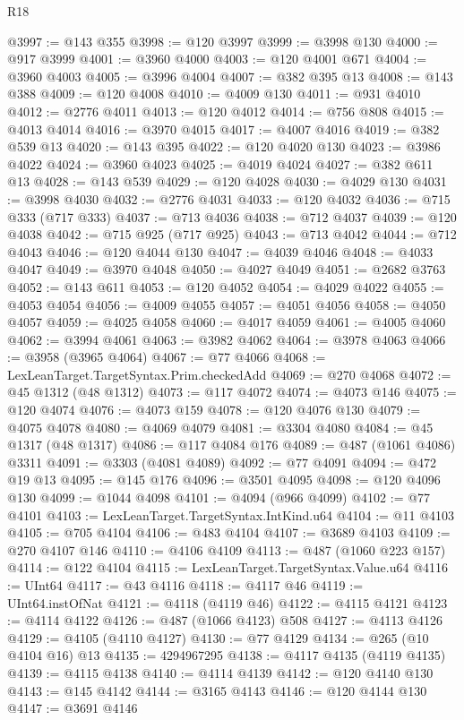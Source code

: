 \begin{lexlean}{R18}
\begin{coremodule}
@3997 := @143 @355
@3998 := @120 @3997
@3999 := @3998 @130
@4000 := @917 @3999
@4001 := @3960 @4000
@4003 := @120 @4001 @671
@4004 := @3960 @4003
@4005 := @3996 @4004
@4007 := @382 @395 @13
@4008 := @143 @388
@4009 := @120 @4008
@4010 := @4009 @130
@4011 := @931 @4010
@4012 := @2776 @4011
@4013 := @120 @4012
@4014 := @756 @808
@4015 := @4013 @4014
@4016 := @3970 @4015
@4017 := @4007 @4016
@4019 := @382 @539 @13
@4020 := @143 @395
@4022 := @120 @4020 @130
@4023 := @3986 @4022
@4024 := @3960 @4023
@4025 := @4019 @4024
@4027 := @382 @611 @13
@4028 := @143 @539
@4029 := @120 @4028
@4030 := @4029 @130
@4031 := @3998 @4030
@4032 := @2776 @4031
@4033 := @120 @4032
@4036 := @715 @333 (@717 @333)
@4037 := @713 @4036
@4038 := @712 @4037
@4039 := @120 @4038
@4042 := @715 @925 (@717 @925)
@4043 := @713 @4042
@4044 := @712 @4043
@4046 := @120 @4044 @130
@4047 := @4039 @4046
@4048 := @4033 @4047
@4049 := @3970 @4048
@4050 := @4027 @4049
@4051 := @2682 @3763
@4052 := @143 @611
@4053 := @120 @4052
@4054 := @4029 @4022
@4055 := @4053 @4054
@4056 := @4009 @4055
@4057 := @4051 @4056
@4058 := @4050 @4057
@4059 := @4025 @4058
@4060 := @4017 @4059
@4061 := @4005 @4060
@4062 := @3994 @4061
@4063 := @3982 @4062
@4064 := @3978 @4063
@4066 := @3958 (@3965 @4064)
@4067 := @77 @4066
@4068 := LexLeanTarget.TargetSyntax.Prim.checkedAdd
@4069 := @270 @4068
@4072 := @45 @1312 (@48 @1312)
@4073 := @117 @4072
@4074 := @4073 @146
@4075 := @120 @4074
@4076 := @4073 @159
@4078 := @120 @4076 @130
@4079 := @4075 @4078
@4080 := @4069 @4079
@4081 := @3304 @4080
@4084 := @45 @1317 (@48 @1317)
@4086 := @117 @4084 @176
@4089 := @487 (@1061 @4086) @3311
@4091 := @3303 (@4081 @4089)
@4092 := @77 @4091
@4094 := @472 @19 @13
@4095 := @145 @176
@4096 := @3501 @4095
@4098 := @120 @4096 @130
@4099 := @1044 @4098
@4101 := @4094 (@966 @4099)
@4102 := @77 @4101
@4103 := LexLeanTarget.TargetSyntax.IntKind.u64
@4104 := @11 @4103
@4105 := @705 @4104
@4106 := @483 @4104
@4107 := @3689 @4103
@4109 := @270 @4107 @146
@4110 := @4106 @4109
@4113 := @487 (@1060 @223 @157)
@4114 := @122 @4104
@4115 := LexLeanTarget.TargetSyntax.Value.u64
@4116 := UInt64
@4117 := @43 @4116
@4118 := @4117 @46
@4119 := UInt64.instOfNat
@4121 := @4118 (@4119 @46)
@4122 := @4115 @4121
@4123 := @4114 @4122
@4126 := @487 (@1066 @4123) @508
@4127 := @4113 @4126
@4129 := @4105 (@4110 @4127)
@4130 := @77 @4129
@4134 := @265 (@10 @4104 @16) @13
@4135 := 4294967295
@4138 := @4117 @4135 (@4119 @4135)
@4139 := @4115 @4138
@4140 := @4114 @4139
@4142 := @120 @4140 @130
@4143 := @145 @4142
@4144 := @3165 @4143
@4146 := @120 @4144 @130
@4147 := @3691 @4146

\end{coremodule}
\end{lexlean}

